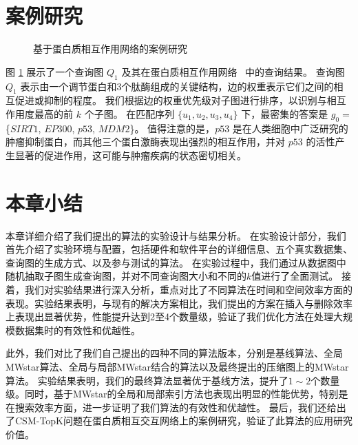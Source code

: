 \section{案例研究}
\begin{figure}[h!]
    \centering
    \caption{基于蛋白质相互作用网络的案例研究}
    \label{fig:human-caseStudy}
    \end{figure}    
图 \ref{fig:human-caseStudy} 展示了一个查询图 $Q_1$ 及其在蛋白质相互作用网络~\cite{dat-protein} 中的查询结果。
    查询图$Q_1$ 表示由一个调节蛋白和3个肽酶组成的关键结构，边的权重表示它们之间的相互促进或抑制的程度。
    我们根据边的权重优先级对子图进行排序，以识别与相互作用度最高的前 $k$ 个子图。
    在匹配序列 $\{u_1, u_2, u_3, u_4\}$ 下，最密集的答案是 $g_0=$\{$SIRT1$, $EP300$, $p53$, $MDM2$\}。
    值得注意的是，$p53$ 是在人类细胞中广泛研究的肿瘤抑制蛋白，而其他三个蛋白激酶表现出强烈的相互作用，并对 $p53$ 的活性产生显著的促进作用，这可能与肿瘤疾病的状态密切相关。
\section{本章小结}
本章详细介绍了我们提出的算法的实验设计与结果分析。
在实验设计部分，我们首先介绍了实验环境与配置，包括硬件和软件平台的详细信息、五个真实数据集、查询图的生成方式、以及参与测试的算法。
在实验过程中，我们通过从数据图中随机抽取子图生成查询图，并对不同查询图大小和不同的$k$值进行了全面测试。
接着，我们对实验结果进行深入分析，重点对比了不同算法在时间和空间效率方面的表现。实验结果表明，与现有的解决方案相比，我们提出的方案在插入与删除效率上表现出显著优势，性能提升达到2至4个数量级，验证了我们优化方法在处理大规模数据集时的有效性和优越性。

此外，我们对比了我们自己提出的四种不同的算法版本，分别是基线算法、全局MWstar算法、全局与局部MWstar结合的算法以及最终提出的压缩图上的MWstar算法。
实验结果表明，我们的最终算法显著优于基线方法，提升了$1\sim2$个数量级。同时，基于MWstar的全局和局部索引方法也表现出明显的性能优势，特别是在搜索效率方面，进一步证明了我们算法的有效性和优越性。
最后，我们还给出了CSM-TopK问题在蛋白质相互交互网络上的案例研究，验证了此算法的应用研究价值。